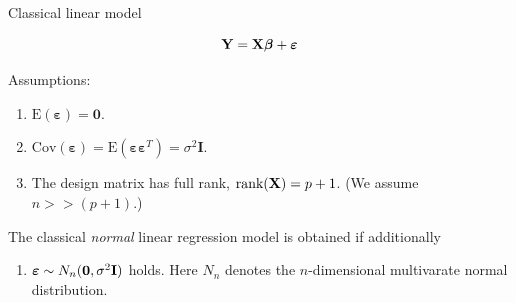 \documentclass[10pt,ignorenonframetext,]{beamer}
\providecommand{\tightlist}{%
  \setlength{\itemsep}{0pt}\setlength{\parskip}{0pt}}
\begin{document}
\begin{frame}

\begin{block}{Classical linear model}

\[{\bf Y=X \boldsymbol\beta}+{\boldsymbol \varepsilon}\]

Assumptions:

\begin{enumerate}
\def\labelenumi{\arabic{enumi}.}
\tightlist
\item
  \(\text{E}(\boldsymbol{\varepsilon})=\boldsymbol{0}\).
\item
  \(\text{Cov}(\boldsymbol{\varepsilon})=\text{E}(\boldsymbol{\varepsilon}\boldsymbol{\varepsilon}^T)=\sigma^2\boldsymbol{I}\).
\item
  The design matrix has full rank, \(\text{rank}({\bf X})=p+1\). (We
  assume \(n>>(p+1)\).)
\end{enumerate}

The classical \emph{normal} linear regression model is obtained if
additionally

\begin{enumerate}
\def\labelenumi{\arabic{enumi}.}
\setcounter{enumi}{3}
\tightlist
\item
  \(\boldsymbol\varepsilon\sim N_n({\boldsymbol 0},\sigma^2 {\bf I})\)
  holds. Here \(N_n\) denotes the \(n\)-dimensional multivarate normal
  distribution.
\end{enumerate}

\end{block}

\end{frame}
\end{document}

